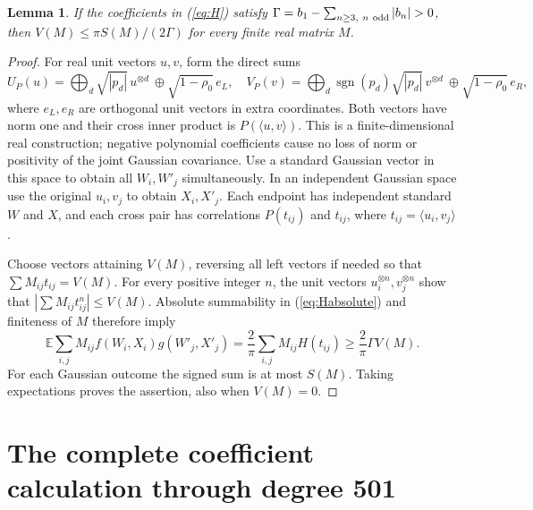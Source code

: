 \documentclass[11pt]{article}
\newtheorem{lemma}[theorem]{Lemma}
\theoremstyle{definition}\newtheorem{definition}[theorem]{Definition}
\newcommand{\E}{\mathbb E}
\newcommand{\sgn}{\operatorname{sgn}}
\begin{document}
\begin{lemma}\label{lem:rounding}
If the coefficients in (\ref{eq:H}) satisfy
$\Gamma=b_1-\sum_{n\geq3,\ n\ {\rm odd}}|b_n|>0$, then
$V(M)\leq\pi S(M)/(2\Gamma)$ for every finite real matrix $M$.
\end{lemma}
\begin{proof}
For real unit vectors $u,v$, form the direct sums
\[
 U_P(u)=\bigoplus_d\sqrt{|p_d|}\,u^{\otimes d}
               \ \oplus\sqrt{1-\rho_0}\,e_L,
 \quad
 V_P(v)=\bigoplus_d\sgn(p_d)\sqrt{|p_d|}\,v^{\otimes d}
               \ \oplus\sqrt{1-\rho_0}\,e_R,
\]
where $e_L,e_R$ are orthogonal unit vectors in extra coordinates.
Both vectors have norm one and their cross inner product is
$P(\langle u,v\rangle)$. This is a finite-dimensional real construction;
negative polynomial coefficients cause no loss of norm or positivity of
the joint Gaussian covariance. Use a standard Gaussian vector in this
space to obtain all $W_i,W'_j$ simultaneously. In an independent Gaussian
space use the original $u_i,v_j$ to obtain $X_i,X'_j$. Each endpoint has
independent standard $W$ and $X$, and each cross pair has correlations
$P(t_{ij})$ and $t_{ij}$, where $t_{ij}=\langle u_i,v_j\rangle$.

Choose vectors attaining $V(M)$, reversing all left vectors if needed so
that $\sum M_{ij}t_{ij}=V(M)$. For every positive integer $n$, the unit
vectors $u_i^{\otimes n},v_j^{\otimes n}$ show that
$|\sum M_{ij}t_{ij}^n|\leq V(M)$. Absolute summability in
(\ref{eq:Habsolute}) and finiteness of $M$ therefore imply
\[
 \E\sum_{i,j}M_{ij}f(W_i,X_i)g(W'_j,X'_j)
 =\frac2\pi\sum_{i,j}M_{ij}H(t_{ij})
 \geq\frac2\pi\Gamma V(M).
\]
For each Gaussian outcome the signed sum is at most $S(M)$. Taking
expectations proves the assertion, also when $V(M)=0$.
\end{proof}

\section{The complete coefficient calculation through degree 501}
\end{document}
